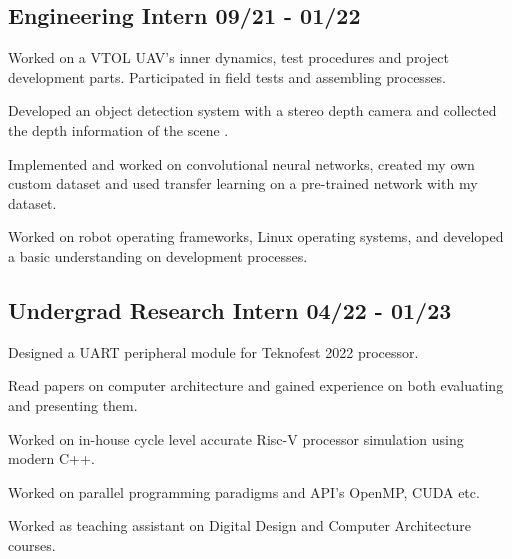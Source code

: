 \documentclass[a4paper,12pt]{article}
\begin{document}


\vspace*{10pt}
\subsection{{Engineering Intern }\hfill 09/21 - 01/22}
\begin{zitemize}
\item Worked on a VTOL UAV's inner dynamics, test procedures and project development parts. Participated in field tests and assembling processes.
\item Developed an object detection system with a stereo depth camera and collected the depth information of the scene .
\item Implemented and worked on convolutional neural networks, created my own custom dataset and used transfer learning on a pre-trained network with my dataset.
\item Worked on robot operating frameworks, Linux operating systems, and developed a basic understanding on development processes.

\end{zitemize}

\vspace*{6pt}
\subsection{{Undergrad Research Intern }\hfill 04/22 - 01/23}
\begin{zitemize}
\item Designed a UART peripheral module for Teknofest 2022 processor. 
\item Read papers on computer architecture and gained experience on both evaluating and presenting them.
\item Worked on in-house cycle level accurate Risc-V processor simulation using modern C++.
\item Worked on parallel programming paradigms and API's OpenMP, CUDA etc.
\item Worked as teaching assistant on Digital Design and Computer Architecture courses.

\end{zitemize}
\end{document}
